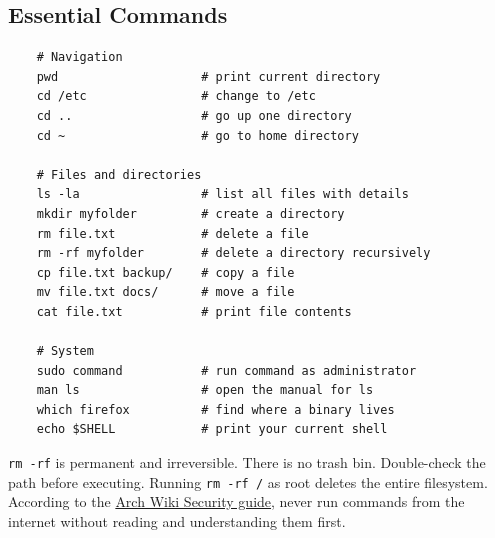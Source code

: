 \documentclass{article}
\newcommand{\code}[1]{\colorbox{codebg}{\texttt{#1}}}
\begin{document}
\begin{center}
\end{center}


\subsection{Essential Commands}

\begin{verbatim}
	# Navigation
	pwd                    # print current directory
	cd /etc                # change to /etc
	cd ..                  # go up one directory
	cd ~                   # go to home directory
	
	# Files and directories
	ls -la                 # list all files with details
	mkdir myfolder         # create a directory
	rm file.txt            # delete a file
	rm -rf myfolder        # delete a directory recursively
	cp file.txt backup/    # copy a file
	mv file.txt docs/      # move a file
	cat file.txt           # print file contents
	
	# System
	sudo command           # run command as administrator
	man ls                 # open the manual for ls
	which firefox          # find where a binary lives
	echo $SHELL            # print your current shell
\end{verbatim}

\begin{tcolorbox}[arc=12pt, outer arc=10pt,
	colback=red!5!white, colframe=red!60!black,
	title=\textbf{Warning}]
	\code{rm -rf} is permanent and irreversible. There is no trash bin. Double-check
	the path before executing. Running \code{rm -rf /} as root deletes the entire
	filesystem. According to the
	\href{https://wiki.archlinux.org/title/Security}{Arch Wiki Security guide}, never
	run commands from the internet without reading and understanding them first.
\end{tcolorbox}
\end{document}
